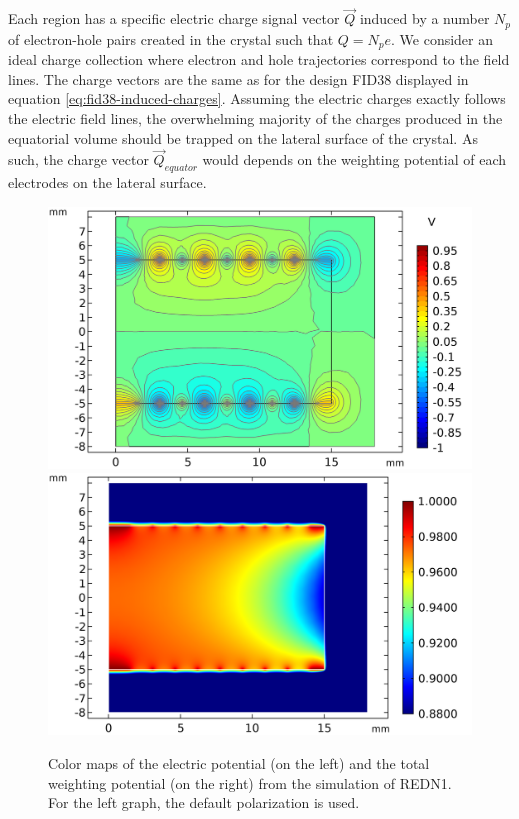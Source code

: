 Each region has a specific electric charge signal vector $\vec{Q}$ induced by a number $N_p$ of electron-hole pairs created in the crystal such that $Q = N_p e$. We consider an ideal charge collection where electron and hole trajectories correspond to the field lines. The charge vectors are the same as for the design FID38 displayed in equation \ref{eq:fid38-induced-charges}.
Assuming the electric charges exactly follows the electric field lines, the overwhelming majority of the charges produced in the equatorial volume should be trapped on the lateral surface of the crystal. As such, the charge vector $\vec{Q}_{equator}$ would depends on the weighting potential of each electrodes on the lateral surface.

\begin{figure}
\centering
\includegraphics[scale=0.5]{Figures/ElectrodesExperimental/potential_redn1.png}
\includegraphics[scale=0.5]{Figures/ElectrodesExperimental/twp_redn1.png}
\caption{Color maps of the electric potential (on the left) and the total weighting potential (on the right) from the simulation of REDN1. For the left graph, the default polarization is used.}
\label{fig:redn1-potential-twp}
\end{figure}

